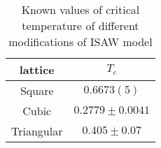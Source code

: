 \begin{table}[h]
    \centering
    \begin{tabular}{|c|c|}
        \hline
        lattice & $T_{c}$ \\ \hline
        Square & $0.6673(5)$ \cite{Caracciolo2011} \\ \hline
        Cubic & $0.2779 \pm 0.0041$\cite{Tesi1996} \\ \hline
        Triangular & $ 0.405 \pm 0.07$\cite{Privman1986} \\ \hline
    \end{tabular}

    \label{tab:ISAW_T_c}
    \medskip
    \caption{Known values of critical temperature of different modifications of ISAW model}
\end{table}
